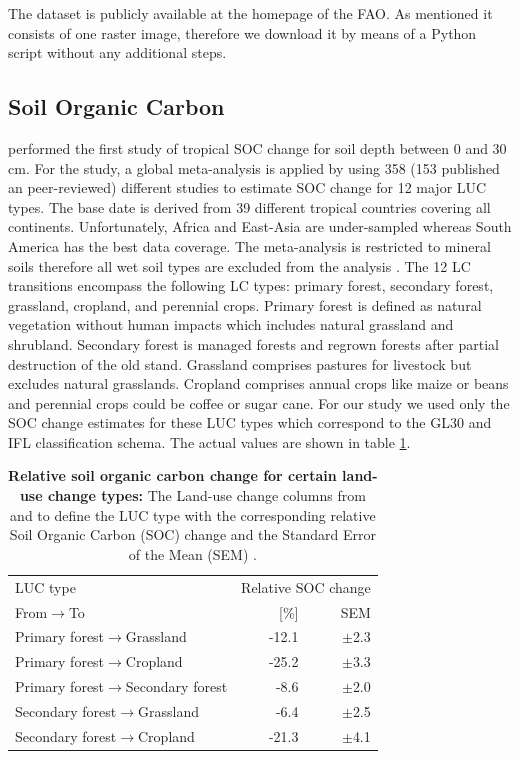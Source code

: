 		The dataset is publicly available at the homepage of the \ac{FAO}. As mentioned it consists of one raster image, therefore we download it by means of a Python script without any additional steps.

	\subsection{Soil Organic Carbon}
		\citeauthor{Don2010} performed the first study of tropical \ac{SOC} change for soil depth between 0 and 30 cm. For the study, a global meta-analysis is applied by using 358 (153 published an peer-reviewed) different studies to estimate \ac{SOC} change for 12 major \ac{LUC} types. The base date is derived from 39 different tropical countries covering all continents. Unfortunately, Africa and East-Asia are under-sampled whereas South America has the best data coverage. The meta-analysis is restricted to mineral soils therefore all wet soil types are excluded from the analysis \citeauthor{Don2010}. The 12 \ac{LC} transitions encompass the following \ac{LC} types: primary forest, secondary forest, grassland, cropland, and perennial crops. Primary forest is defined as natural vegetation without human impacts which includes natural grassland and shrubland. Secondary forest is managed forests and regrown forests after partial destruction of the old stand. Grassland comprises pastures for livestock but excludes natural grasslands. Cropland comprises annual crops like maize or beans and perennial crops could be coffee or sugar cane. For our study we used only the \ac{SOC} change estimates for these \ac{LUC} types which correspond to the \ac{GL30} and \ac{IFL} classification schema. The actual values are shown in table \ref{tab:soc_factors}.
		\begin{table}[ht]
			\centering
			\caption[Relative soil organic carbon change for certain land-use change types]{\textbf{Relative soil organic carbon change for certain land-use change types:} The Land-use change columns from and to define the LUC type with the corresponding relative Soil Organic Carbon (SOC) change and the Standard Error of the Mean (SEM) \citep{Don2010}.}
			\label{tab:soc_factors}
			\begin{tabular}{lrr}
				\hline
				LUC type & \multicolumn{2}{c}{Relative SOC change} \\
				From$\rightarrow$To & [\%] & SEM \\\hline
				Primary forest$\rightarrow$Grassland & -12.1 & $\pm$2.3 \\
				Primary forest$\rightarrow$Cropland & -25.2 & $\pm$3.3 \\
				Primary forest$\rightarrow$Secondary forest & -8.6 & $\pm$2.0 \\
				Secondary forest$\rightarrow$Grassland & -6.4 & $\pm$2.5 \\
				Secondary forest$\rightarrow$Cropland & -21.3 & $\pm$4.1 \\\hline
			\end{tabular}
		\end{table}

